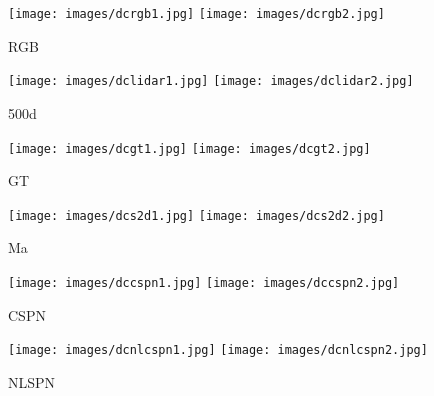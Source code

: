 \documentclass[5p]{elsarticle}
\begin{document}
\begin{figure*}[t!]
     \centering
          \begin{subfigure}[t]{0.12\textwidth}
         \centering
         \caption{RGB}
         \texttt{[image: images/dcrgb1.jpg]}
         \hspace{1em}
         \texttt{[image: images/dcrgb2.jpg]}
         \label{nyulidarsubfig0:rgb}
     \end{subfigure}
     \begin{subfigure}[t]{0.12\textwidth}
         \centering
         \caption{500d}
         \texttt{[image: images/dclidar1.jpg]}
         \hspace{1em}
         \texttt{[image: images/dclidar2.jpg]}
         \label{nyulidarsubfig0:lidar}
     \end{subfigure}
         \begin{subfigure}[t]{0.12\textwidth}
         \centering
         \caption{GT}
         \texttt{[image: images/dcgt1.jpg]}
         \hspace{1em}
         \texttt{[image: images/dcgt2.jpg]}
         \label{nyulidarsubfig0:gt}
     \end{subfigure}
         \begin{subfigure}[t]{0.12\textwidth}
         \centering
         \caption{Ma \etal\cite{ma2018sparse}}
         \texttt{[image: images/dcs2d1.jpg]}
         \hspace{1em}
         \texttt{[image: images/dcs2d2.jpg]}
         \label{nyulidarsubfig0:ma}
     \end{subfigure}
         \begin{subfigure}[t]{0.12\textwidth}
         \centering
         \caption{CSPN \cite{cheng2018depth}}
         \texttt{[image: images/dccspn1.jpg]}
         \hspace{1em}
         \texttt{[image: images/dccspn2.jpg]}
         \label{nyulidarsubfig0:cheng}
     \end{subfigure}
         \begin{subfigure}[t]{0.12\textwidth}
         \centering
         \caption{NLSPN \cite{park2020non}}
         \texttt{[image: images/dcnlcspn1.jpg]}
         \hspace{1em}
         \texttt{[image: images/dcnlcspn2.jpg]}
         \label{nyulidarsubfig0:park}
     \end{subfigure}

\end{figure*}
\end{document}
